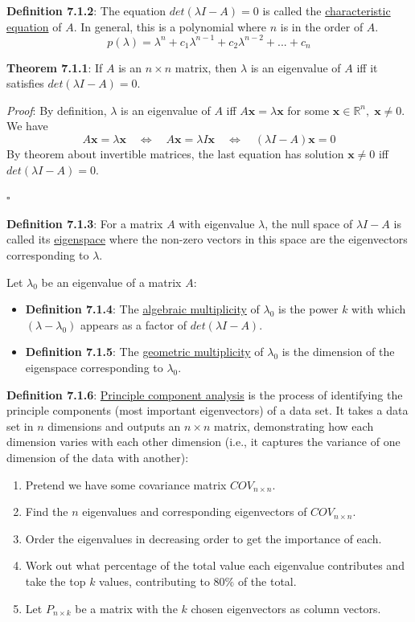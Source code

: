 \documentclass{article}
\newcommand{\separate}[1] {\vspace{#1 pt}\noindent}
\newcommand{\R}{\mathbb{R}}
\newcommand{\definition}[2]{\textbf{Definition #1}: #2\label{def:#1}}
\newcommand{\proof}[2]{\textit{Proof}: #2 \begin{flushright}\(\square\)\end{flushright}\label{prf:#1}}
\newcommand{\theorem}[3]{\textbf{Theorem #1}: #2 \par\separate{3}\proof{thm:#1}{#3}\label{thm:#1}}
\begin{document}
\separate{7}\definition{7.1.2}{The equation \(det(\lambda I - A) = 0\) is called the \underline{characteristic equation} of \(A\). In general, this is a polynomial where \(n\) is in the order of \(A\).}
\begin{equation}
    p(\lambda) = \lambda^n + c_1\lambda^{n-1} + c_2\lambda^{n-2} + ... + c_n
\end{equation}

\separate{7}\theorem{7.1.1}{If \(A\) is an \(n \times n\) matrix, then \(\lambda\) is an eigenvalue of \(A\) iff it satisfies \(det(\lambda I - A) = 0\).}
{By definition, \(\lambda\) is an eigenvalue of \(A\) iff \(A\mathbf{x} = \lambda\mathbf{x}\) for some \(\mathbf{x} \in \R^n,\;\mathbf{x} \neq 0\). We have
\begin{equation}
    A\mathbf{x} = \lambda\mathbf{x} \quad\iff\quad A\mathbf{x} = \lambda I \mathbf{x} \quad\iff\quad (\lambda I - A)\mathbf{x} = 0 
\end{equation}
By theorem about invertible matrices, the last equation has solution \(\mathbf{x} \neq 0\) iff \(det(\lambda I - A) = 0\).}

\separate{7}\definition{7.1.3}{For a matrix \(A\) with eigenvalue \(\lambda\), the null space of \(\lambda I - A\) is called its \underline{eigenspace} where the non-zero vectors in this space are the eigenvectors corresponding to \(\lambda\).}

\separate{7}Let \(\lambda_0\) be an eigenvalue of a matrix \(A\):
\begin{itemize}
    \item \definition{7.1.4}{The \underline{algebraic multiplicity} of \(\lambda_0\) is the power \(k\) with which \((\lambda - \lambda_0)\) appears as a factor of \(det(\lambda I - A)\).}
    \item \definition{7.1.5}{The \underline{geometric multiplicity} of \(\lambda_0\) is the dimension of the eigenspace corresponding to \(\lambda_0\).}
\end{itemize}

\newpage\noindent\definition{7.1.6}{\underline{Principle component analysis} is the process of identifying the principle components (most important eigenvectors) of a data set. It takes a data set in \(n\) dimensions and outputs an \(n \times n\) matrix, demonstrating how each dimension varies with each other dimension (i.e., it captures the variance of one dimension of the data with another):}
\begin{enumerate}
    \item Pretend we have some covariance matrix \(COV_{n\times n}\).
    \item Find the \(n\) eigenvalues and corresponding eigenvectors of \(COV_{n \times n}\).
    \item Order the eigenvalues in decreasing order to get the importance of each.
    \item Work out what percentage of the total value each eigenvalue contributes and take the top \(k\) values, contributing to \(80\%\) of the total. 
    \item Let \(P_{n \times k}\) be a matrix with the \(k\) chosen eigenvectors as column vectors.
\end{enumerate}
\end{document}
